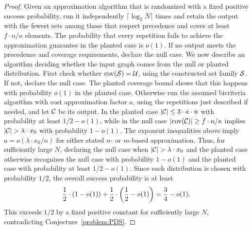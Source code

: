 \begin{proof}
    Given an approximation algorithm that is randomized with a fixed positive success probability, run it independently $\lceil\log_2 N\rceil$ times and retain the output with the fewest sets among those that respect precedence and cover at least $f\cdot n/\kappa$ elements.
    The probability that every repetition fails to achieve the approximation guarantee in the planted case is $o(1)$. If no output meets the precedence and coverage requirements, declare the null case.
    We now describe an algorithm deciding whether the input graph comes from the null or planted distribution. First check whether $\operatorname{cov}\mathopen{}\left( \mathcal{S} \right)=\mathcal{U}$, using the constructed set family $\mathcal{S}$. If not, declare the null case. The planted coverage bound shows that this happens with probability $o(1)$ in the planted case. Otherwise run the assumed bicriteria algorithm with cost approximation factor $a$, using the repetitions just described if needed, and let $\mathcal{C}$ be its output. In the planted case $\mathopen{}\left| \mathcal{C} \right|\leq3\cdot a\cdot n$ with probability at least $1/2-o(1)$, while in the null case $\mathopen{}\left| \operatorname{cov}\mathopen{}\left( \mathcal{C} \right) \right|\geq f\cdot n/\kappa$ implies $\spr{\cC}>\lambda\cdot x_0$ with probability $1-o(1)$. The exponent inequalities above imply $a=o(\lambda\cdot x_0/n)$ for either stated $n$- or $m$-based approximation. Thus, for sufficiently large $N$, declaring the null case when $\spr{\cC}>\lambda\cdot x_0$ and the planted case otherwise recognizes the null case with probability $1-o(1)$ and the planted case with probability at least $1/2-o(1)$. Since each distribution is chosen with probability $1/2$, the overall success probability is at least
    \[
        \frac12\cdot\mathopen{}\left( 1-o(1) \right)+\frac12\cdot\mathopen{}\left( \frac12-o(1) \right)
        =\frac34-o(1).
    \]
    This exceeds $1/2$ by a fixed positive constant for sufficiently large $N$, contradicting Conjecture~\ref{problem:PDS}.
\end{proof}


